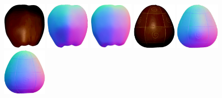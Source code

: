     \\
    \includegraphics[width=0.16\textwidth]{ch-psfcn/images/Results/Gourd/2.0_apple_I_0003.png}
    \includegraphics[width=0.16\textwidth]{ch-psfcn/images/Results/LightStage/L2/apple_Normal_l2_4.0.jpg}
    \includegraphics[width=0.16\textwidth]{ch-psfcn/images/Results/LightStage/PS-FCN_normalize/apple_Normal_DiLiGenT.jpg}
    \includegraphics[width=0.16\textwidth]{ch-psfcn/images/Results/Gourd/2.0_gourd1_I_0003.png}
    \includegraphics[width=0.16\textwidth]{ch-psfcn/images/Results/LightStage/L2/gourd1_Normal_l2_4.0.jpg}
    \includegraphics[width=0.16\textwidth]{ch-psfcn/images/Results/LightStage/PS-FCN_normalize/gourd1_Normal_DiLiGenT.jpg}
